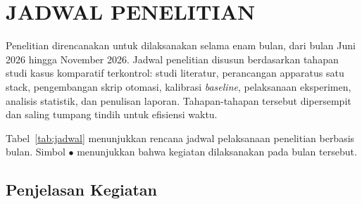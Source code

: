 \chapter{JADWAL PENELITIAN}

Penelitian direncanakan untuk dilaksanakan selama enam bulan, dari bulan Juni 2026 hingga November 2026. Jadwal penelitian disusun berdasarkan tahapan studi kasus komparatif terkontrol: studi literatur, perancangan apparatus satu stack, pengembangan skrip otomasi, kalibrasi \textit{baseline}, pelaksanaan eksperimen, analisis statistik, dan penulisan laporan. Tahapan-tahapan tersebut dipersempit dan saling tumpang tindih untuk efisiensi waktu.

Tabel~\ref{tab:jadwal} menunjukkan rencana jadwal pelaksanaan penelitian berbasis bulan. Simbol $\bullet$ menunjukkan bahwa kegiatan dilaksanakan pada bulan tersebut.

\begin{table}[H]
  \centering
  \caption{Jadwal Penelitian (Gantt Chart)}
  \label{tab:jadwal}
\end{table}

\section{Penjelasan Kegiatan}

